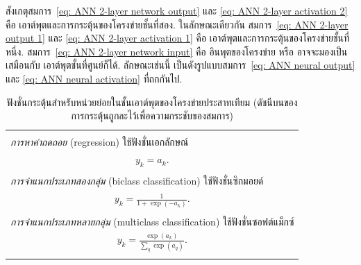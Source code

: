 สังเกตุสมการ~\ref{eq: ANN 2-layer network output} และ \ref{eq: ANN 2-layer activation 2} คือ เอาต์พุตและการกระตุ้นของโครงข่ายชั้นที่สอง.
ในลักษณะเดียวกัน สมการ~\ref{eq: ANN 2-layer output 1} และ \ref{eq: ANN 2-layer activation 1} คือ เอาต์พุตและการกระตุ้นของโครงข่ายชั้นที่หนึ่ง.
สมการ~\ref{eq: ANN 2-layer network input} คือ อินพุตของโครงข่าย หรือ อาจจะมองเป็นเสมือนกับ เอาต์พุตชั้นที่ศูนย์ก็ได้.
ลักษณะเช่นนี้ เป็นดังรูปแบบสมการ~\ref{eq: ANN neural output} และ \ref{eq: ANN neural activation} ที่ถกกันไป.

%
\begin{table}[hbtp]
\caption{ฟังชั่นกระตุ้นสำหรับหน่วยย่อยในชั้นเอาต์พุตของโครงข่ายประสาทเทียม
(ดัชนีบนของการกระตุ้นถูกละไว้เพื่อความกระชับของสมการ)}
\begin{center}
\begin{tabular}{|l|}
\hline 
\\
\textit{การหาค่าถดถอย} (regression) ใช้ฟังชั่นเอกลักษณ์ \\
\multicolumn{1}{|c|}{$y_k = a_k$.} \\
\\
\textit{การจำแนกประเภทสองกลุ่ม} (biclass classification) ใช้ฟังชั่นซิกมอยด์ \\
\multicolumn{1}{|c|}{$y_k = \frac{1}{1+\exp(-a_k)}$.} \\
\\
\textit{การจำแนกประเภทหลายกลุ่ม} (multiclass classification) ใช้ฟังชั่นซอฟต์แม็กซ์ \\ 
\multicolumn{1}{|c|}{$y_k = \frac{\exp(a_k)}{\sum_q \exp(a_q)}$.} \\
\\
\hline
\end{tabular} 
\end{center}
\label{tbl: ANN output activation function}
\end{table}

